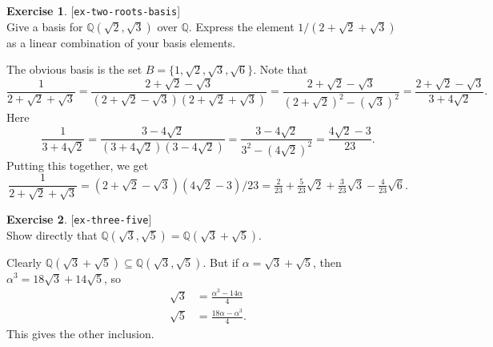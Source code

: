 \documentclass{amsart}
\newcommand{\Q}         {{\mathbb{Q}}}
\newcommand{\al}        {\alpha}
\renewcommand{\:}{\colon}
\newcommand{\lastexlabel}{}
\newcommand{\exlabel}[1]{
 \global\def\lastexlabel{#1}\label{#1}[\texttt{#1}]\ \\
}
\newcommand{\exlabel}[1]{
 \global\def\lastexlabel{#1}\label{#1}
}
\newenvironment{solution}{\SolutionInline}{\endSolutionInline}
\theoremstyle{definition}
\newtheorem{exercise}{Exercise}[section]
\renewenvironment{solution}{\SolutionAtEnd}{\endSolutionAtEnd}
\begin{document}
\begin{exercise}\exlabel{ex-two-roots-basis}
 Give a basis for $\Q(\sqrt{2},\sqrt{3})$ over $\Q$.  Express the
 element $1/(2+\sqrt{2}+\sqrt{3})$ as a linear combination of your
 basis elements.
\end{exercise}
\begin{solution}
 The obvious basis is the set $B=\{1,\sqrt{2},\sqrt{3},\sqrt{6}\}$.
 Note that
 \[ \frac{1}{2+\sqrt{2}+\sqrt{3}} = 
    \frac{2+\sqrt{2}-\sqrt{3}}{(2+\sqrt{2}-\sqrt{3})(2+\sqrt{2}+\sqrt{3})} = 
    \frac{2+\sqrt{2}-\sqrt{3}}{(2+\sqrt{2})^2-(\sqrt{3})^2} = 
    \frac{2+\sqrt{2}-\sqrt{3}}{3+4\sqrt{2}}.
 \]
 Here 
 \[ \frac{1}{3+4\sqrt{2}} = 
    \frac{3-4\sqrt{2}}{(3+4\sqrt{2})(3-4\sqrt{2})} = 
    \frac{3-4\sqrt{2}}{3^2-(4\sqrt{2})^2} = 
    \frac{4\sqrt{2}-3}{23}.
 \]
 Putting this together, we get 
 \[ \frac{1}{2+\sqrt{2}+\sqrt{3}} = 
    (2+\sqrt{2}-\sqrt{3})(4\sqrt{2}-3)/23 = 
    \tfrac{2}{23} + \tfrac{5}{23}\sqrt{2} +
     \tfrac{3}{23}\sqrt{3} - \tfrac{4}{23}\sqrt{6}.
 \]
\end{solution}
\begin{exercise}\exlabel{ex-three-five}
 Show directly that $\Q(\sqrt{3},\sqrt{5})=\Q(\sqrt{3}+\sqrt{5})$.
\end{exercise}
\begin{solution}
 Clearly $\Q(\sqrt{3}+\sqrt{5})\subseteq\Q(\sqrt{3},\sqrt{5})$.  But
 if $\al=\sqrt{3}+\sqrt{5}$, then $\al^3=18\sqrt{3}+14\sqrt{5}$,
 so
 \begin{align*}
  \sqrt{3} &= \frac{\al^3-14\al}{4} \\
  \sqrt{5} &= \frac{18\al - \al^3}{4}.
 \end{align*}
 This gives the other inclusion.
\end{solution}
\end{document}
